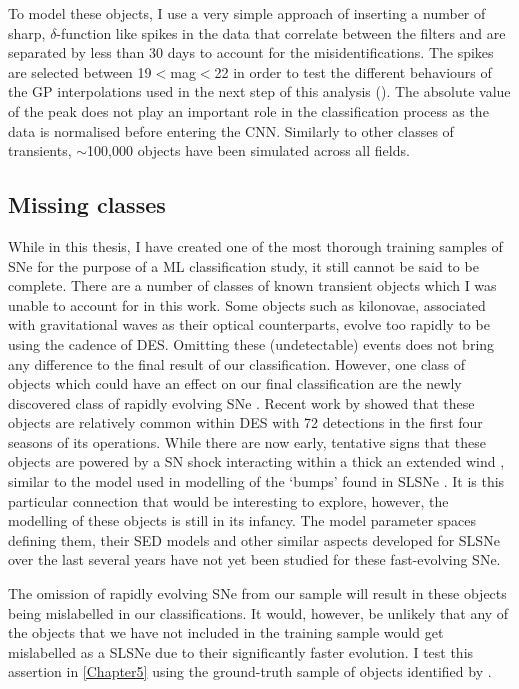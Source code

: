 To model these objects, I use a very simple approach of inserting a number of sharp, $\delta$-function like spikes in the data that correlate between the filters and are separated by less than 30 days to account for the misidentifications. The spikes are selected between 19$<$mag$<$22 in order to test the different behaviours of the GP interpolations used in the next step of this analysis (). The absolute value of the peak does not play an important role in the classification process as the data is normalised before entering the CNN. Similarly to other classes of transients, $\sim$100,000 objects have been simulated across all fields.

\subsection{Missing classes}
While in this thesis, I have created one of the most thorough training samples of SNe for the purpose of a ML classification study, it still cannot be said to be complete. There are a number of classes of known transient objects which I was unable to account for in this work. Some objects such as kilonovae, associated with gravitational waves as their optical counterparts, evolve too rapidly to be using the cadence of DES. Omitting these (undetectable) events does not bring any difference to the final result of our classification. However, one class of objects which could have an effect on our final classification are the newly discovered class of rapidly evolving SNe \cite{Drout2014,Kepler2018}. Recent work by \citet{Pursiainen2018} showed that these objects are relatively common within DES with 72 detections in the first four seasons of its operations. While there are now early, tentative signs \citep{Pursiainen2018} that these objects are powered by a SN shock interacting within a thick an extended wind \citep{Piro2015}, similar to the model used in modelling of the `bumps' found in SLSNe . It is this particular connection that would be interesting to explore, however, the modelling of these objects is still in its infancy. The model parameter spaces defining them, their SED models and other similar aspects developed for SLSNe over the last several years have not yet been studied for these fast-evolving SNe.

The omission of rapidly evolving SNe from our sample will result in these objects being mislabelled in our classifications. It would, however, be unlikely that any of the objects that we have not included in the training sample would get mislabelled as a SLSNe due to their significantly faster evolution. I test this assertion in \cref{Chapter5} using the ground-truth sample of objects identified by \citet{Pursiainen2018}.

